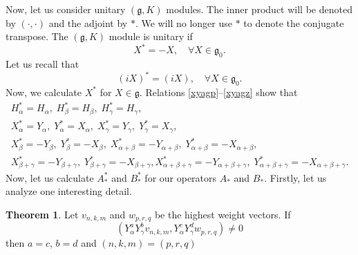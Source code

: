 \documentclass[twoside,a4paper,12pt]{article}
\newcommand{\g}{\ensuremath{\mathfrak g}}
\newcommand{\go}{\ensuremath{{\mathfrak g}_0}}
\theoremstyle{definition}
\newtheorem{theorem}{Theorem}
\begin{document}
Now, let us consider unitary $(\g,K)$ modules. The inner product will be denoted
by $(\cdot,\cdot)$ and the adjoint by $*$. We will no longer use $*$ to denote
the conjugate transpose. The $(\g,K)$ module is unitary if
\begin{equation*}
	X^*=-X,\quad\forall X\in\go.
\end{equation*}
Let us recall that
\begin{equation*}
	(iX)^*=(iX),\quad\forall X\in\go.
\end{equation*}
Now, we calculate $X^*$ for $X\in\g$. Relations \eqref{xyagp}--\eqref{xyagz}
show that
\begin{gather}
	H_\alpha^*=H_\alpha,\;H_\beta^*=H_\beta,\;H_\gamma^*=H_\gamma,\label{hst}\\
	X_\alpha^*=Y_\alpha,\;Y_\alpha^*=X_\alpha,\;
	X_\gamma^*=Y_\gamma,\;Y_\gamma^*=X_\gamma,\label{acst}\\
	X_\beta^*=-Y_\beta,\;Y_\beta^*=-X_\beta,\;
	X_{\alpha+\beta}^*=-Y_{\alpha+\beta},\;
	Y_{\alpha+\beta}^*=-X_{\alpha+\beta},\label{bst}\\
	X_{\beta+\gamma}^*=-Y_{\beta+\gamma},\;
	Y_{\beta+\gamma}^*=-X_{\beta+\gamma},
	X_{\alpha+\beta+\gamma}^*=-Y_{\alpha+\beta+\gamma},\;
	Y_{\alpha+\beta+\gamma}^*=-X_{\alpha+\beta+\gamma}\label{abcst}.
\end{gather}
Now, let us calculate $A_*^*$ and $B_*^*$ for our operators $A_*$ and $B_*$.
Firstly, let us analyze one interesting detail.

\begin{theorem}\label{thinpr}
	Let $v_{n,k,m}$ and $w_{p,r,q}$ be the highest weight vectors. If
	\begin{equation}
		(Y_\alpha^aY_\gamma^bv_{n,k,m},Y_\alpha^cY_\gamma^dw_{p,r,q})\neq0
	\end{equation}
	then $a=c$, $b=d$ and $(n,k,m)=(p,r,q)$
\end{theorem}
\end{document}
